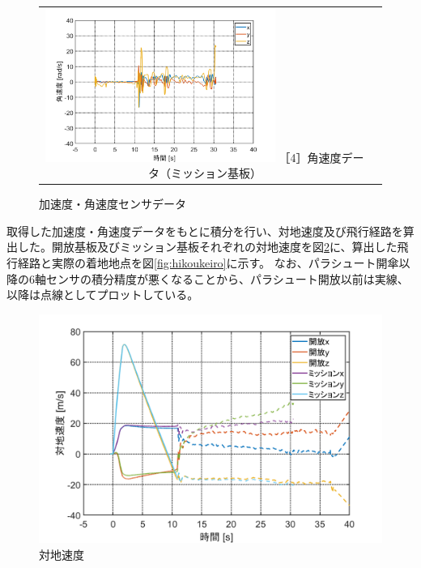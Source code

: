 \documentclass[a4paper,11pt,uplatex]{jsarticle}
\begin{document}
\begin{figure}[H]
\begin{tabular}{cc}
		\begin{minipage}{.48\textwidth}
			\centering
			\includegraphics[width=75mm]{pic_sim/gyr_ta.png}
			\hspace{16mm} {\small［4］角速度データ（ミッション基板）}
		\end{minipage}
	\end{tabular}
	\caption{加速度・角速度センサデータ}
	\label{fig:rokuziku}
\end{figure}

取得した加速度・角速度データをもとに積分を行い、対地速度及び飛行経路を算出した。開放基板及びミッション基板それぞれの対地速度を図\ref{fig:taitisokudo}に、算出した飛行経路と実際の着地地点を図\ref{fig:hikoukeiro}に示す。
なお、パラシュート開傘以降の6軸センサの積分精度が悪くなることから、パラシュート開放以前は実線、以降は点線としてプロットしている。

\begin{figure}[H]
	\centering
	\includegraphics[width=0.7\linewidth]{pic_sim/Ve2.png}
	\caption{対地速度}
	\label{fig:taitisokudo}
\end{figure}
\end{document}
